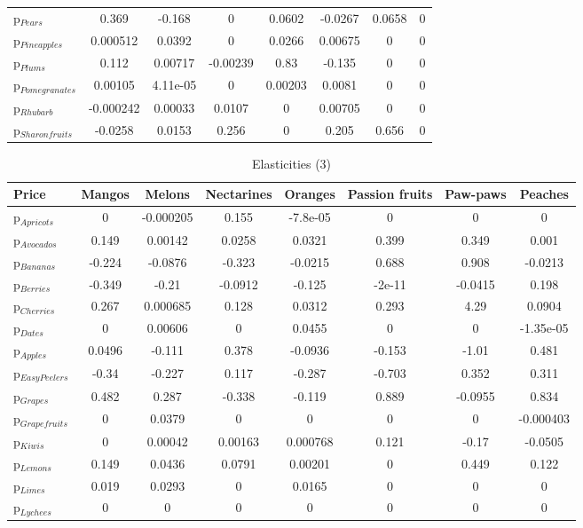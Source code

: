 \documentclass[11pt]{article}
\begin{document}
\begin{table}[h]
\begin{center}
\begin{tabular}{lccccccc}
p$_{Pears}$ &0.369 &-0.168 &0 &0.0602 &-0.0267 &0.0658 &0 \\
p$_{Pineapples}$ &0.000512 &0.0392 &0 &0.0266 &0.00675 &0 &0 \\
p$_{Plums}$ &0.112 &0.00717 &-0.00239 &0.83 &-0.135 &0 &0 \\
p$_{Pomegranates}$ &0.00105 &4.11e-05 &0 &0.00203 &0.0081 &0 &0 \\
p$_{Rhubarb}$ &-0.000242 &0.00033 &0.0107 &0 &0.00705 &0 &0 \\
p$_{Sharon fruits}$ &-0.0258 &0.0153 &0.256 &0 &0.205 &0.656 &0 \\
\end{tabular}
\end{center}
\end{table}
\begin{table}[h]
\caption{Elasticities (3)}
\label{table:elasticities 3}
\begin{center}
\begin{tabular}{lccccccc} \hline \hline
Price &Mangos &Melons &Nectarines &Oranges &Passion fruits &Paw-paws &Peaches \\ \hline
p$_{Apricots}$ &0 &-0.000205 &0.155 &-7.8e-05 &0 &0 &0 \\
p$_{Avocados}$ &0.149 &0.00142 &0.0258 &0.0321 &0.399 &0.349 &0.001 \\
p$_{Bananas}$ &-0.224 &-0.0876 &-0.323 &-0.0215 &0.688 &0.908 &-0.0213 \\
p$_{Berries}$ &-0.349 &-0.21 &-0.0912 &-0.125 &-2e-11 &-0.0415 &0.198 \\
p$_{Cherries}$ &0.267 &0.000685 &0.128 &0.0312 &0.293 &4.29 &0.0904 \\
p$_{Dates}$ &0 &0.00606 &0 &0.0455 &0 &0 &-1.35e-05 \\
p$_{Apples}$ &0.0496 &-0.111 &0.378 &-0.0936 &-0.153 &-1.01 &0.481 \\
p$_{Easy Peelers}$ &-0.34 &-0.227 &0.117 &-0.287 &-0.703 &0.352 &0.311 \\
p$_{Grapes}$ &0.482 &0.287 &-0.338 &-0.119 &0.889 &-0.0955 &0.834 \\
p$_{Grapefruits}$ &0 &0.0379 &0 &0 &0 &0 &-0.000403 \\
p$_{Kiwis}$ &0 &0.00042 &0.00163 &0.000768 &0.121 &-0.17 &-0.0505 \\
p$_{Lemons}$ &0.149 &0.0436 &0.0791 &0.00201 &0 &0.449 &0.122 \\
p$_{Limes}$ &0.019 &0.0293 &0 &0.0165 &0 &0 &0 \\
p$_{Lychees}$ &0 &0 &0 &0 &0 &0 &0 \\

\end{tabular}
\end{center}
\end{table}
\end{document}
